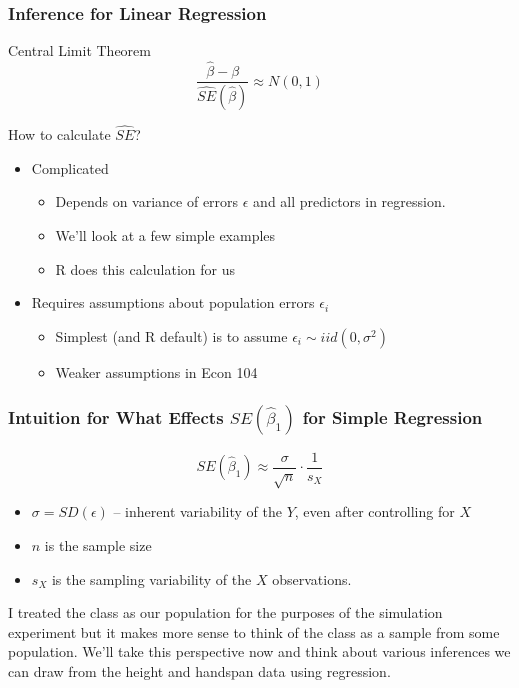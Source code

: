 \documentclass[handout]{beamer}
\begin{document}
\begin{frame}
\frametitle{Inference for Linear Regression}
	\begin{block}{Central Limit Theorem}
		$$\frac{\widehat{\beta} - \beta}{\widehat{SE}(\widehat{\beta})} \approx N(0,1)$$ 
\end{block}

\begin{block}{How to calculate $\widehat{SE}$?}
	\begin{itemize}
\item Complicated 
	\begin{itemize}
\item Depends on variance of errors $\epsilon$ and all predictors in regression. 
\item We'll look at a few simple examples 
\item R does this calculation for us 
\end{itemize}
\item Requires assumptions about population errors $\epsilon_i$ 
	\begin{itemize}
\item Simplest (and R default) is to assume $\epsilon_i \sim iid (0,\sigma^2)$ 
\item Weaker assumptions in Econ 104 
\end{itemize}

\end{itemize}
\end{block}

\end{frame}
\begin{frame}
\frametitle{Intuition for What Effects $SE(\widehat{\beta}_1)$ for Simple Regression}

	$$SE(\widehat{\beta}_1) \approx \frac{\sigma}{\sqrt{n}} \cdot \frac{1}{s_X}$$
	\begin{itemize}
	\item $\sigma = SD(\epsilon)$ -- inherent variability of the $Y$, even after controlling for $X$
	\item $n$ is the sample size
	\item $s_X$ is the sampling variability of the $X$ observations.
	\end{itemize}
\end{frame}


\begin{frame}
I treated the class as our population for the purposes of the simulation experiment but it makes more sense to think of the class as a sample from some population. We'll take this perspective now and think about various inferences we can draw from the height and handspan data using regression.
\end{frame}
\end{document}
